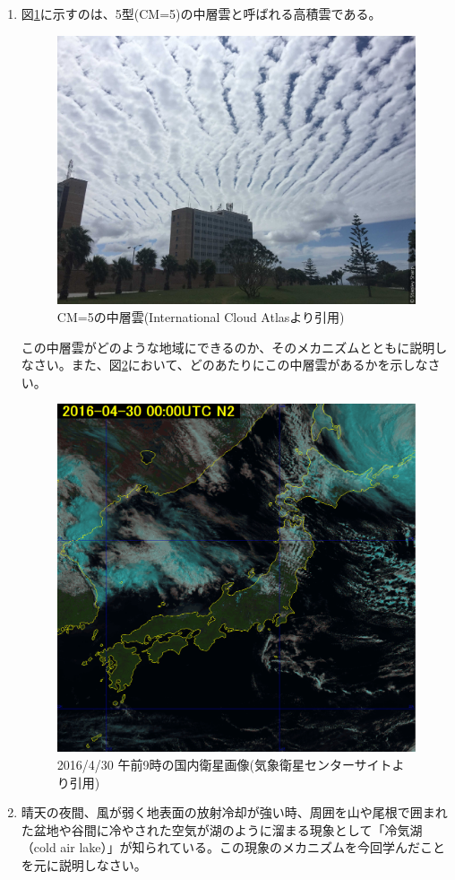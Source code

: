 \documentclass{jsarticle}
\newenvironment{problems}
{
  \renewcommand\labelenumi{\doublebox{\arabic{enumi}}}
  \begin{enumerate}
}{
  \end{enumerate}
  \renewcommand\labelenumi{\arabic{enumi}.}
}
\begin{document}
\begin{problems}
    \item 図\ref{CloudAtlas}に示すのは、5型(CM=5)の中層雲と呼ばれる高積雲である。
        \begin{figure}[h]
        \centering
        \includegraphics[width=0.6\linewidth,keepaspectratio]{CloudAtlas_CM5.eps}
        \caption{CM=5の中層雲(International Cloud Atlasより引用)}\label{CloudAtlas}
        \end{figure}
     この中層雲がどのような地域にできるのか、そのメカニズムとともに説明しなさい。また、図\ref{Sate}において、どのあたりにこの中層雲があるかを示しなさい。
        \begin{figure}[h]
        \centering
        \includegraphics[width=0.6\linewidth,keepaspectratio]{Sate.eps}
        \caption{2016/4/30 午前9時の国内衛星画像(気象衛星センターサイトより引用)}\label{Sate}
        \end{figure}

    \item 晴天の夜間、風が弱く地表面の放射冷却が強い時、周囲を山や尾根で囲まれた盆地や谷間に冷やされた空気が湖のように溜まる現象として「冷気湖（cold air lake）」が知られている。この現象のメカニズムを今回学んだことを元に説明しなさい。

\end{problems}
\end{document}
